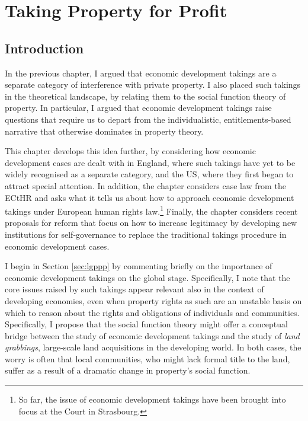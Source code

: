 
\chapter{Taking Property for Profit}\label{chap:2}

\section{Introduction}\label{sec:intro}

In the previous chapter, I argued that economic development takings are a separate category of interference with private property. I also placed such takings in the theoretical landscape, by relating them to the social function theory of property. In particular, I argued that economic development takings raise questions that require us to depart from the individualistic, entitlements-based narrative that otherwise dominates in property theory.

This chapter develops this idea further, by considering how economic development cases are dealt with in England, where such takings have yet to be widely recognised as a separate category, and the US, where they first began to attract special attention. In addition, the chapter considers case law from the ECtHR and asks what it tells us about how to approach economic development takings under European human rights law.\footnote{So far, the issue of economic development takings have been brought into focus at the Court in Strasbourg.}
Finally, the chapter considers recent proposals for reform that focus on how to increase legitimacy by developing new institutions for self-governance to replace the traditional takings procedure in economic development cases.

I begin in Section \ref{sec:lgppp} by commenting briefly on the importance of economic development takings on the global stage. Specifically, I note that the core issues raised by such takings appear relevant also in the context of developing economies, even when property rights as such are an unstable basis on which to reason about the rights and obligations of individuals and communities. Specifically, I propose that the social function theory might offer a conceptual bridge between the study of economic development takings and the study of {\it land grabbings}, large-scale land acquisitions in the developing world. In both cases, the worry is often that local communities, who might lack formal title to the land, suffer as a result of a dramatic change in property's social function.

